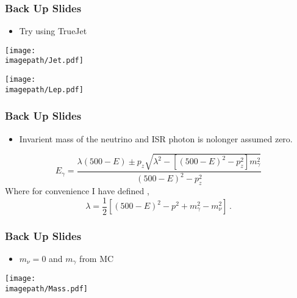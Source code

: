 \begin{frame}\frametitle{Back Up Slides }

    \begin{itemize}
        \item Try  using TrueJet
    \end{itemize}
    \begin{minipage}{0.49\textwidth}
        \centering
        \texttt{[image: \\imagepath/Jet.pdf]}
    \end{minipage}\hfill
    \begin{minipage}{0.49\textwidth}
        \centering
        \texttt{[image: \\imagepath/Lep.pdf]}
    \end{minipage}

\end{frame}

\begin{frame}\frametitle{Back Up Slides }

    \begin{itemize}
        \item Invarient mass of the neutrino and ISR photon is nolonger assumed zero.
    \end{itemize}
    \begin{equation}
        {E}_{\gamma}    = \frac{{\lambda}(500 - E)  \pm {p}_{z}\sqrt{ {\lambda}^{2} - [{(500 - E)}^{2} -{p}_{z}^{2}]{m}_{\gamma}^{2}}}{{(500 - E)}^{2} -   {p}_{z}^{2}}
    \end{equation}
    Where for convenience I have defined ,
    \begin{equation}
        {\lambda} = \frac{1}{2}[{(500 - E)}^2 - {p}^{2} + {m}_{\gamma}^{2} - {m}_{\nu}^{2}] \, .
    \end{equation}

\end{frame}

\begin{frame}\frametitle{Back Up Slides }
    \begin{itemize}
        \item ${m}_{\nu} = 0$ and ${m}_{\gamma}$ from MC
    \end{itemize}
    \centering
    \texttt{[image: \\imagepath/Mass.pdf]}

\end{frame}

